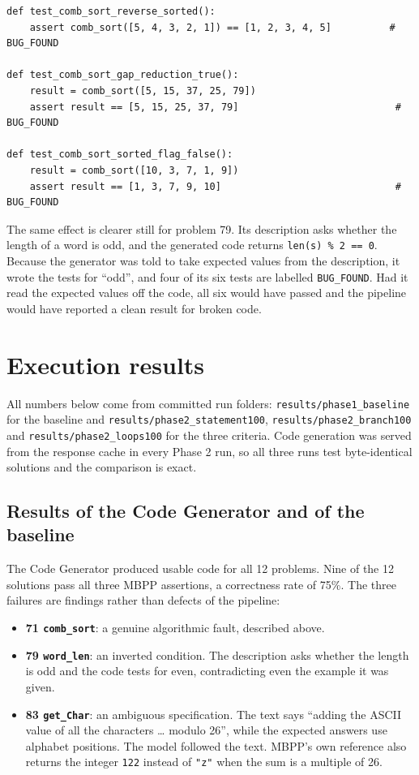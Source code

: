 \documentclass[11pt,a4paper]{article}
\begin{document}
\begin{lstlisting}[style=py]
def test_comb_sort_reverse_sorted():
    assert comb_sort([5, 4, 3, 2, 1]) == [1, 2, 3, 4, 5]          # BUG_FOUND

def test_comb_sort_gap_reduction_true():
    result = comb_sort([5, 15, 37, 25, 79])
    assert result == [5, 15, 25, 37, 79]                           # BUG_FOUND

def test_comb_sort_sorted_flag_false():
    result = comb_sort([10, 3, 7, 1, 9])
    assert result == [1, 3, 7, 9, 10]                              # BUG_FOUND
\end{lstlisting}

The same effect is clearer still for problem 79. Its description asks whether the length of a word is odd, and
the generated code returns \texttt{len(s) \% 2 == 0}. Because the generator was told to take expected values
from the description, it wrote the tests for ``odd'', and four of its six tests are labelled
\texttt{BUG\_FOUND}. Had it read the expected values off the code, all six would have passed and the pipeline
would have reported a clean result for broken code.

\section{Execution results}
\label{sec:results}

All numbers below come from committed run folders: \texttt{results/phase1\_baseline} for the baseline and
\texttt{results/phase2\_statement100}, \texttt{results/phase2\_branch100} and
\texttt{results/phase2\_loops100} for the three criteria. Code generation was served from the response cache in
every Phase 2 run, so all three runs test byte-identical solutions and the comparison is exact.

\subsection{Results of the Code Generator and of the baseline}

The Code Generator produced usable code for all 12 problems. Nine of the 12 solutions pass all three MBPP
assertions, a correctness rate of 75\%. The three failures are findings rather than defects of the pipeline:

\begin{itemize}\itemsep2pt
  \item \textbf{71 \texttt{comb\_sort}}: a genuine algorithmic fault, described above.
  \item \textbf{79 \texttt{word\_len}}: an inverted condition. The description asks whether the length is odd
        and the code tests for even, contradicting even the example it was given.
  \item \textbf{83 \texttt{get\_Char}}: an ambiguous specification. The text says ``adding the ASCII value of
        all the characters \ldots{} modulo 26'', while the expected answers use alphabet positions. The model
        followed the text. MBPP's own reference also returns the integer \texttt{122} instead of \texttt{"z"}
        when the sum is a multiple of 26.
\end{itemize}
\end{document}
